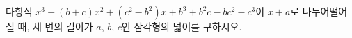 다항식 $x^3-(b+c)x^2+(c^2-b^2)x+b^3+b^2c-bc^2-c^3$이 $x+a$로 나누어떨어질 때, 세 변의 길이가 $a$, $b$, $c$인 삼각형의 넓이를 구하시오.
